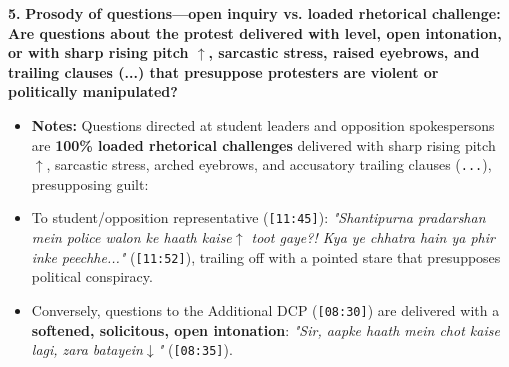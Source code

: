 \documentclass[10pt,a4paper]{article}
\begin{document}
\noindent\textbf{5.} \textbf{Prosody of questions---open inquiry vs. loaded rhetorical challenge: Are questions about the protest delivered with level, open intonation, or with sharp rising pitch $\uparrow$, sarcastic stress, raised eyebrows, and trailing clauses (...) that presuppose protesters are violent or politically manipulated?}\par\smallskip
\begin{itemize}
  \item \textbf{Notes:}
Questions directed at student leaders and opposition spokespersons are \textbf{100\% loaded rhetorical challenges} delivered with sharp rising pitch \texttt{$\uparrow$}, sarcastic stress, arched eyebrows, and accusatory trailing clauses (\texttt{...}), presupposing guilt:\par\smallskip
  \item To student/opposition representative (\texttt{[11:45]}): \textit{"Shantipurna pradarshan mein police walon ke haath kaise$\uparrow$ toot gaye?! Kya ye chhatra hain ya phir inke peechhe..."} (\texttt{[11:52]}), trailing off with a pointed stare that presupposes political conspiracy.
  \item Conversely, questions to the Additional DCP (\texttt{[08:30]}) are delivered with a \textbf{softened, solicitous, open intonation}: \textit{"Sir, aapke haath mein chot kaise lagi, zara batayein$\downarrow$"} (\texttt{[08:35]}).
\end{itemize}
\end{document}
